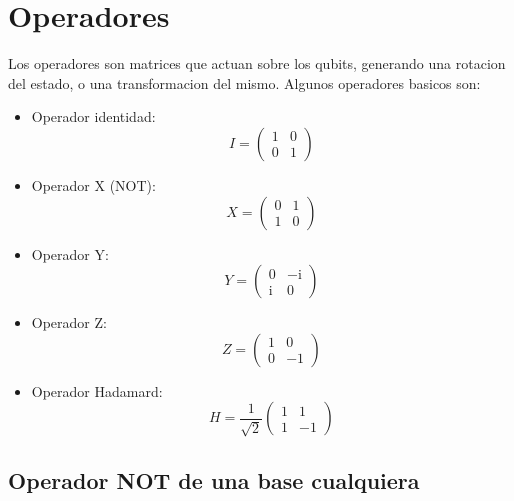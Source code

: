 \documentclass[11pt]{article}
\newcommand{\ii}{\mathrm{i}}
\begin{document}
\section{Operadores}

Los operadores son matrices que actuan sobre los qubits, generando una rotacion del estado, o una transformacion del mismo. Algunos operadores basicos son:

\begin{itemize}
    \item Operador identidad:
    \begin{equation}
        I = \begin{pmatrix} 1 & 0 \\ 0 & 1 \end{pmatrix}
    \end{equation}
    
    \item Operador X (NOT):
    \begin{equation}
        X = \begin{pmatrix} 0 & 1 \\ 1 & 0 \end{pmatrix}
    \end{equation}
    
    \item Operador Y:
    \begin{equation}
        Y = \begin{pmatrix} 0 & -\ii \\ \ii & 0 \end{pmatrix}
    \end{equation}
    
    \item Operador Z:
    \begin{equation}
        Z = \begin{pmatrix} 1 & 0 \\ 0 & -1 \end{pmatrix}
    \end{equation}
    
    \item Operador Hadamard:
    \begin{equation}
        H = \frac{1}{\sqrt{2}} \begin{pmatrix} 1 & 1 \\ 1 & -1 \end{pmatrix}
    \end{equation}
\end{itemize}

\subsection{Operador NOT de una base cualquiera}
\end{document}
